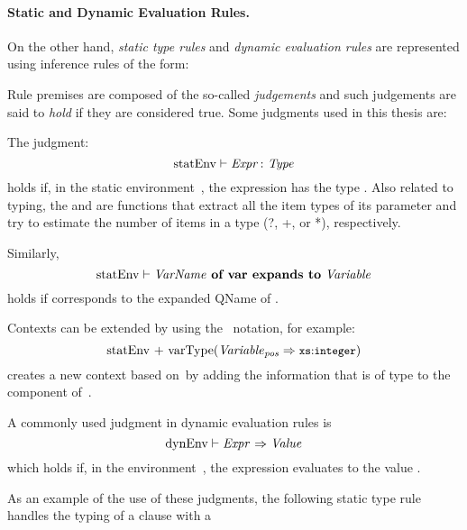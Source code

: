 \paragraph*{Static and Dynamic Evaluation Rules.}
On the other hand, \emph{static type rules} and \emph{dynamic evaluation rules} are represented using inference rules
of the form:
%
\begin{prooftree}
\end{prooftree} 
%
Rule premises are composed of the so-called \emph{judgements} and such judgements are said to \emph{hold} if they are
considered true.  Some judgments used in this thesis are:
%
\begin{description}
\setlength{}
\setlength{}
\setlength{}
\setlength{}
\item[Type.] The judgment:
  \[\statEnv{\envElem{Expr}{} \colon \envElem{Type}{}}\] 
  holds if, in the static environment~\stat, the expression  has the type .
  Also related to typing, the  and  are functions that extract all the item types
  of its parameter and try to estimate the number of items in a type (?, +, or *), respectively.
%
\item[Variable Expansion.] Similarly, \[\statEnv \envElem{VarName}{}~\textbf{of var expands to}~\envElem{Variable}{}\]
  holds if  corresponds to the expanded QName of .
%
\item[Context Extension.] Contexts can be extended by using the~\character{$+$} notation, for
  example: \[\stat\envExtend{varType}{\envElem{Variable}{pos} \Rightarrow \qname{xs}{integer}}\] creates a new context
  based on~\stat by adding the information that  is of type  to the
   component of~\stat.
%
\item[Expression Evaluation.] A commonly used judgment in dynamic evaluation rules is
  \[\dynEnv{\envElem{Expr}{} \Rightarrow \envElem{Value}{}}\] which holds if, in the environment~\dyn, the expression
   evaluates to the value .
%
\end{description}
%
As an example of the use of these judgments, the following static type rule handles the typing of a \FOR clause with a
